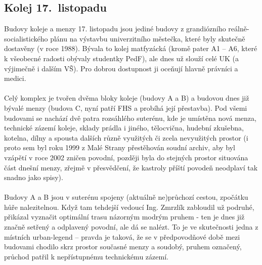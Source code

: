 \subsection{Kolej 17.~listopadu}
Budovy koleje a menzy 17. listopadu jsou jediné budovy z grandiózního
reálně-socialistického plánu na výstavbu univerzitního městečka, které byly
skutečně dostavěny (v roce 1988). Bývala to kolej matfyzácká (kromě pater A1 –
A6, které k všeobecné radosti obývaly studentky PedF), ale dnes už slouží celé
UK (a výjimečně i dalším VŠ). Pro dobrou dostupnost ji oceňují hlavně právníci a
medici.
\\\\
Celý komplex je tvořen dvěma bloky koleje (budovy A a B) a budovou dnes již
bývalé menzy (budova C, nyní patří FHS a probíhá její přestavba). Pod všemi
budovami se nachází dvě patra rozsáhlého suterénu, kde je umístěna nová menza,
technické zázemí koleje, sklady prádla i jiného, tělocvična, hudební zkušebna,
kotelna, dílny a spousta dalších různě využitých či zcela nevyužitých prostor (i
proto sem byl roku 1999 z Malé Strany přestěhován soudní archiv, aby byl vzápětí
v roce 2002 zničen povodní, později byla do stejných prostor situována část
dnešní menzy, zřejmě v přesvědčení, že kastroly příští povodeň neodplaví tak
snadno jako spisy).
\\\\
Budovy A a B jsou v suterénu spojeny (aktuálně ne)průchozí cestou, zpočátku hůře
nalezitelnou. Když tam tehdejší vedoucí Ing. Zmrzlík zabloudil už podruhé,
přikázal vyznačit optimální trasu názorným modrým pruhem - ten je dnes již
značně setřený a odplavený povodní, ale dá se nalézt. To je ve skutečnosti jedna
z místních urban-legend – pravda je taková, že se v předpovodňové době mezi
budovami chodilo skrz prostor současné menzy a soudobý, pruhem označený, průchod
patřil k nepřístupnému technickému zázemí.


